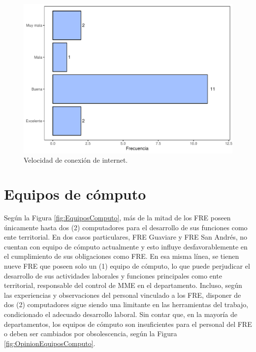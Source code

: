 \documentclass[
  oneside]{book}
\begin{document}
\begin{figure}[b!]

{\centering \includegraphics[width=0.85\linewidth]{InformeFinal_files/figure-latex/ConexionInternet-1} 

}

\caption{Velocidad de conexión de internet.}\label{fig:ConexionInternet}
\end{figure}

\hypertarget{equipos-de-cuxf3mputo}{%
\section{Equipos de cómputo}\label{equipos-de-cuxf3mputo}}

Según la Figura \ref{fig:EquiposComputo}, más de la mitad de los FRE poseen únicamente hasta dos (2) computadores para el desarrollo de sus funciones como ente territorial. En dos casos particulares, FRE Guaviare y FRE San Andrés, no cuentan con equipo de cómputo actualmente y esto influye desfavorablemente en el cumplimiento de sus obligaciones como FRE. En esa misma línea, se tienen nueve FRE que poseen solo un (1) equipo de cómputo, lo que puede perjudicar el desarrollo de sus actividades laborales y funciones principales como ente territorial, responsable del control de MME en el departamento. Incluso, según las experiencias y observaciones del personal vinculado a los FRE, disponer de dos (2) computadores sigue siendo una limitante en las herramientas del trabajo, condicionado el adecuado desarrollo laboral. Sin contar que, en la mayoría de departamentos, los equipos de cómputo son insuficientes para el personal del FRE o deben ser cambiados por obsolescencia, según la Figura \ref{fig:OpinionEquiposComputo}.
\end{document}
